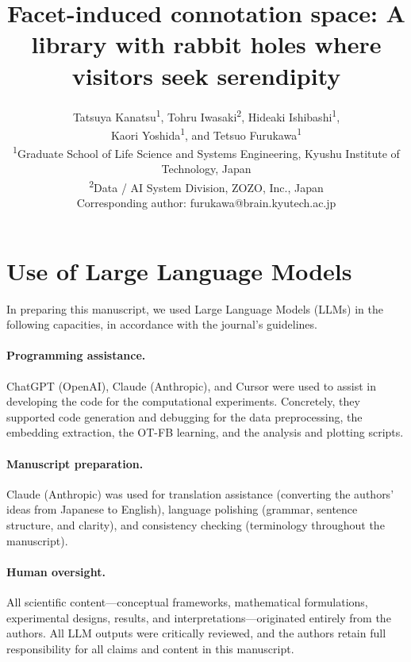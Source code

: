 \documentclass[11pt,a4paper]{article}
\begin{document}
\title{Facet-induced connotation space: A library with rabbit holes where visitors seek serendipity}
\author{
    Tatsuya Kanatsu\textsuperscript{1}, Tohru Iwasaki\textsuperscript{2}, Hideaki Ishibashi\textsuperscript{1}, \\
    Kaori Yoshida\textsuperscript{1}, and Tetsuo Furukawa\textsuperscript{1} \\[3pt]
    \small \textsuperscript{1}Graduate School of Life Science and Systems Engineering, Kyushu Institute of Technology, Japan \\
    \small \textsuperscript{2}Data / AI System Division, ZOZO, Inc., Japan \\
    \small Corresponding author: furukawa@brain.kyutech.ac.jp
}
\date{}
\maketitle

\section{Use of Large Language Models}\label{sup:use_of_llms}
In preparing this manuscript, we used Large Language Models (LLMs) in the
following capacities, in accordance with the journal's guidelines.

\paragraph{Programming assistance.}
ChatGPT (OpenAI), Claude (Anthropic), and Cursor were used to assist in
developing the code for the computational experiments. Concretely, they
supported code generation and debugging for the data preprocessing, the
embedding extraction, the OT-FB learning, and the analysis and plotting
scripts.

\paragraph{Manuscript preparation.}
Claude (Anthropic) was used for translation assistance (converting the
authors' ideas from Japanese to English), language polishing (grammar,
sentence structure, and clarity), and consistency checking (terminology
throughout the manuscript).

\paragraph{Human oversight.}
All scientific content---conceptual frameworks, mathematical formulations,
experimental designs, results, and interpretations---originated entirely from
the authors. All LLM outputs were critically reviewed, and the authors retain
full responsibility for all claims and content in this manuscript.
\end{document}
